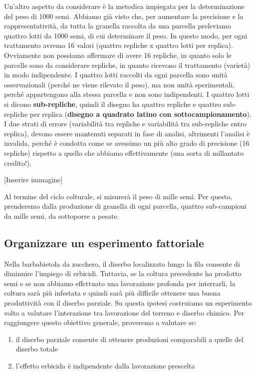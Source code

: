 \documentclass[a4paper,12pt,oneside]{book}
\providecommand{\tightlist}{%
  \setlength{\itemsep}{0pt}\setlength{\parskip}{0pt}}
\theoremstyle{definition}
\theoremstyle{definition}
\theoremstyle{definition}
\theoremstyle{remark}
\begin{document}
Un'altro aspetto da considerare è la metodica impiegata per la
determinazione del peso di 1000 semi. Abbiamo già visto che, per
aumentare la precisione e la rappresentatività, da tutta la granella
raccolta da una parcella preleviamo quattro lotti da 1000 semi, di cui
determinare il peso. In questo modo, per ogni trattamento avremo 16
valori (quattro repliche x quattro lotti per replica). Ovviamente non
possiamo affermare di avere 16 repliche, in quanto solo le parcelle sono
da considerare repliche, in quanto ricevono il trattamento (varietà) in
modo indipendente. I quattro lotti raccolti da ogni parcella sono unità
osservazionali (perché ne viene rilevato il peso), ma non unità
sperimentali, perché appartengono alla stessa parcella e non sono
indipendenti. I quattro lotti si dicono \textbf{sub-repliche}, quindi il
disegno ha quattro repliche e quattro sub-repliche per replica
(\textbf{disegno a quadrato latino con sottocampionamento}). I due
strati di errore (variabilità tra repliche e variabilità tra
sub-repliche entro replica), devono essere mantenuti separati in fase di
analisi, altrimenti l'analisi è invalida, perché è condotta come se
avessimo un più alto grado di precisione (16 repliche) rispetto a quello
che abbiamo effettivamente (una sorta di millantato credito!).

{[}Inserire immagine{]}

Al termine del ciclo colturale, si misurerà il peso di mille semi. Per
questo, prenderemo dalla produzione di granella di ogni parcella,
quattro sub-campioni da mille semi, da sottoporre a pesate.

\subsection{Organizzare un esperimento
fattoriale}\label{organizzare-un-esperimento-fattoriale}

Nella barbabietola da zucchero, il diserbo localizzato lungo la fila
consente di diminuire l'impiego di erbicidi. Tuttavia, se la coltura
precedente ha prodotto semi e se non abbiamo effettuato una lavorazione
profonda per interrarli, la coltura sarà più infestata e quindi sarà più
difficile ottenere una buona produttività con il diserbo parziale. Su
questa ipotesi costruiamo un esperimento volto a valutare l'interazione
tra lavorazione del terreno e diserbo chimico. Per raggiungere questo
obiettivo generale, proveremo a valutare se:

\begin{enumerate}
\def\labelenumi{\arabic{enumi}.}
\tightlist
\item
  il diserbo parziale consente di ottenere produzioni comparabili a
  quelle del diserbo totale
\item
  l'effetto erbicida è indipendente dalla lavorazione prescelta
\end{enumerate}
\end{document}
